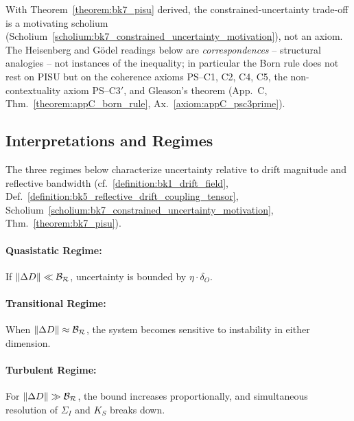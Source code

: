 \begin{remark}
\label{remark:bk7_pisu_status}
With Theorem~\ref{theorem:bk7_pisu} derived, the constrained-uncertainty trade-off is a motivating scholium (Scholium~\ref{scholium:bk7_constrained_uncertainty_motivation}), not an axiom. The Heisenberg and G\"odel readings below are \emph{correspondences} -- structural analogies -- not instances of the inequality; in particular the Born rule does not rest on PISU but on the coherence axioms PS--C1, C2, C4, C5, the non-contextuality axiom PS--C3$'$, and Gleason's theorem (App.~C, Thm.~\ref{theorem:appC_born_rule}, Ax.~\ref{axiom:appC_psc3prime}).
\end{remark}

\subsection{Interpretations and Regimes}
\label{subsec:bk7_pisu_regimes}
The three regimes below characterize uncertainty relative to drift magnitude and reflective bandwidth (cf.~\ref{definition:bk1_drift_field}, Def.~\ref{definition:bk5_reflective_drift_coupling_tensor}, Scholium~\ref{scholium:bk7_constrained_uncertainty_motivation}, Thm.~\ref{theorem:bk7_pisu}).
\paragraph{Quasistatic Regime:} If $\|\Delta D\| \ll \mathcal{B_R}$, uncertainty is bounded by $\eta \cdot \delta_O$.

\paragraph{Transitional Regime:} When $\|\Delta D\| \approx \mathcal{B_R}$, the system becomes sensitive to instability in either dimension.

\paragraph{Turbulent Regime:} For $\|\Delta D\| \gg \mathcal{B_R}$, the bound increases proportionally, and simultaneous resolution of $\Sigma_I$ and $K_S$ breaks down.

